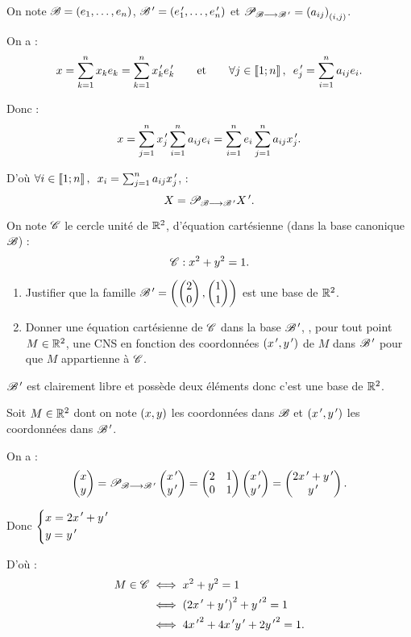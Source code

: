 \begin{dem}
On note \(\mathscr{B}=\left(e_1,\dots,e_n\right)\), \(\mathscr{B}^{\,\prime}=\left(e_1^{\,\prime},\dots,e_n^{\,\prime}\right)\) et \(\mathscr{P}_{\mathscr{B}\longrightarrow\mathscr{B}^{\,\prime}}=\left(a_{ij}\right)_{\left(i,j\right)}\).

On a : \[x=\sum_{k=1}^{n}x_ke_k=\sum_{k=1}^{n}x_k\prim e_k\prim\qquad\text{et}\qquad\quantifs{\forall j\in\interventierii{1}{n}}e_j\prim=\sum_{i=1}^{n}a_{ij}e_i.\]

Donc : \[x=\sum_{j=1}^{n}x_j^{\,\prime}\sum_{i=1}^{n}a_{ij}e_i=\sum_{i=1}^{n}e_i\sum_{j=1}^{n}a_{ij}x_j^{\,\prime}.\]

D'où \(\quantifs{\forall i\in\interventierii{1}{n}}x_i=\sum_{j=1}^{n}a_{ij}x_j\prim\), \cad : \[X=\mathscr{P}_{\mathscr{B}\longrightarrow\mathscr{B}^{\,\prime}}X^{\,\prime}.\]
\end{dem}

\begin{exoex}
On note \(\mathscr{C}\) le cercle unité de \(\mathbb{R}^2\), d'équation cartésienne (dans la base canonique \(\mathscr{B}\)) : \[\mathscr{C}:x^2+y^2=1.\]

\begin{enumerate}
    \item Justifier que la famille \(\mathscr{B}^{\,\prime}=\left(\begin{pmatrix}2\\0\end{pmatrix},\begin{pmatrix}1\\1\end{pmatrix}\right)\) est une base de \(\mathbb{R}^2\). \\
    \item Donner une équation cartésienne de \(\mathscr{C}\) dans la base \(\mathscr{B}^{\,\prime}\), \cad, pour tout point \(M\in\mathbb{R}^2\), une CNS en fonction des coordonnées \(\left(x^{\,\prime},y^{\,\prime}\right)\) de \(M\) dans \(\mathscr{B}^{\,\prime}\) pour que \(M\) appartienne à \(\mathscr{C}\).
\end{enumerate}
\end{exoex}

\begin{corr}[1]
\(\mathscr{B}^{\,\prime}\) est clairement libre et possède deux éléments donc c'est une base de \(\mathbb{R}^2\).
\end{corr}

\begin{corr}[2]
Soit \(M\in\mathbb{R}^2\) dont on note \(\left(x,y\right)\) les coordonnées dans \(\mathscr{B}\) et \(\left(x^{\,\prime},y^{\,\prime}\right)\) les coordonnées dans \(\mathscr{B}^{\,\prime}\).

On a : \[\begin{pmatrix}x\\y\end{pmatrix}=\mathscr{P}_{\mathscr{B}\longrightarrow\mathscr{B}^{\,\prime}}\begin{pmatrix}x^{\,\prime}\\y^{\,\prime}\end{pmatrix}=\begin{pmatrix}
2 & 1 \\
0 & 1
\end{pmatrix}\begin{pmatrix}x^{\,\prime}\\y^{\,\prime}\end{pmatrix}=\begin{pmatrix}2x^{\,\prime}+y^{\,\prime}\\y^{\,\prime}\end{pmatrix}.\]

Donc \(\begin{dcases}
x=2x^{\,\prime}+y^{\,\prime} \\
y=y^{\,\prime}
\end{dcases}\)

D'où : \[\begin{aligned}
M\in\mathscr{C}&\iff x^2+y^2=1 \\
&\iff\left(2x^{\,\prime}+y^{\,\prime}\right)^2+{y^{\,\prime}}^2=1 \\
&\iff4{x^{\,\prime}}^2+4x^{\,\prime} y^{\,\prime}+2{y^{\,\prime}}^2=1.
\end{aligned}\]
\end{corr}

